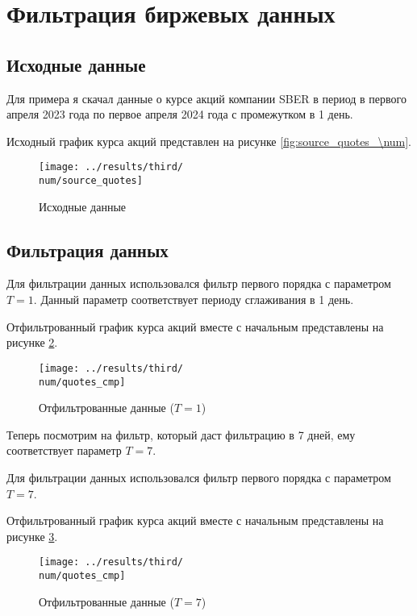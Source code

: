\section{Фильтрация биржевых данных}
\subsection{Исходные данные}
Для примера я скачал данные о курсе акций компании SBER в период в первого апреля 2023 года по первое апреля 2024 года 
с промежутком в 1 день. 

Исходный график курса акций представлен на рисунке \ref{fig:source_quotes_\num}. 


\def\num{1}
\def\T{1} 

\begin{figure}[ht!]
    \centering
    \texttt{[image: ../results/third/\\num/source\_quotes]}
    \caption{Исходные данные}
    \label{fig:source_quotes_\num}
\end{figure}

\subsection{Фильтрация данных}

Для фильтрации данных использовался фильтр первого порядка с параметром $T = \T$.
Данный параметр соответствует периоду сглаживания в 1 день.

Отфильтрованный график курса акций вместе с начальным представлены на рисунке \ref{fig:quotes_cmp_\num}.
\begin{figure}[ht!]
    \centering
    \texttt{[image: ../results/third/\\num/quotes\_cmp]}
    \caption{Отфильтрованные данные ($T = \T$)}
    \label{fig:quotes_cmp_\num}
\end{figure}

\def\num{2}
\def\T{7}
Теперь посмотрим на фильтр, который даст фильтрацию в 7 дней, ему соответствует параметр $T = \T$.

Для фильтрации данных использовался фильтр первого порядка с параметром $T = \T$.

Отфильтрованный график курса акций вместе с начальным представлены на рисунке \ref{fig:quotes_cmp_\num}.
\begin{figure}[ht!]
    \centering
    \texttt{[image: ../results/third/\\num/quotes\_cmp]}
    \caption{Отфильтрованные данные ($T = \T$)}
    \label{fig:quotes_cmp_\num}
\end{figure}

